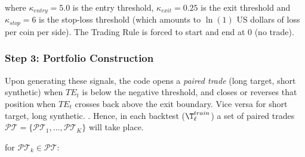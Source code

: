 where $\kappa_{entry} = 5.0$ is the entry threshold, $\kappa_{exit} = 0.25$ is the exit threshold and $\kappa_{stop}=6$ is the stop-loss threshold (which amounts to $\ln(1)$ US dollars of loss per coin per side). The Trading Rule is forced to start and end at 0 (no trade).



\subsubsection*{Step 3: Portfolio Construction}
Upon generating these signals, the code opens a \emph{paired trade} (long target, short synthetic) when $TE_{t}$ is below the negative threshold, and closes or reverses that position when $TE_{t}$ crosses back above the exit boundary. Vice versa for short target, long synthetic. .
Hence, in each backtest ($\T_{\ell}^{train}$) a set of paired trades $\mathcal{PT} = \{ \mathcal{PT}_1, \ldots, \mathcal{PT}_K\}$ will take place. 

\bx 
\noindent for $\mathcal{PT}_k \in \mathcal{PT}$:

